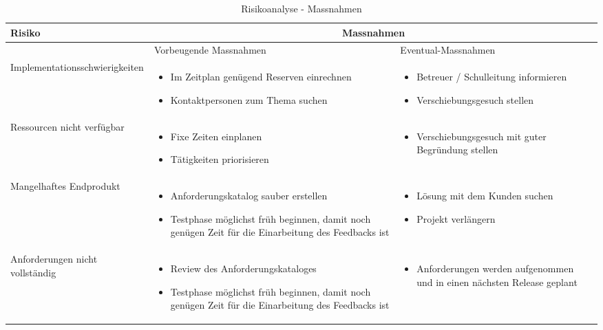 \begin{table}[ht]
\centering
  \begin{tabular}{  l | p{4cm} | p{4cm} }
	\hline
	\rowcolor{darkgray}
	Risiko							&	\multicolumn{2}{|c|}{Massnahmen} \\ \hline
	\rowcolor{gray}
								&	Vorbeugende Massnahmen & Eventual-Massnahmen	\\ \hline
	Implementationsschwierigkeiten
								&	\begin{itemize}
										\item Im Zeitplan genügend Reserven einrechnen
										\item Kontaktpersonen zum Thema suchen
									\end{itemize}
								&	\begin{itemize}
										\item Betreuer / Schulleitung informieren
										\item Verschiebungsgesuch stellen
									\end{itemize}						\\ \hline
	Ressourcen nicht verfügbar
								&	\begin{itemize}
										\item Fixe Zeiten einplanen
										\item Tätigkeiten priorisieren
									\end{itemize}
								&	\begin{itemize}
										\item Verschiebungsgesuch mit guter Begründung stellen
									\end{itemize}	\\ \hline
	Mangelhaftes Endprodukt		
								&	\begin{itemize}
										\item Anforderungskatalog sauber erstellen
										\item Testphase möglichst früh beginnen, damit noch genügen Zeit für die Einarbeitung des Feedbacks ist
									\end{itemize}
								&	\begin{itemize}
										\item Lösung mit dem Kunden suchen
										\item Projekt verlängern
									\end{itemize}	\\ \hline	
	Anforderungen nicht vollständig	
								&	\begin{itemize}
										\item Review des Anforderungskataloges
										\item Testphase möglichst früh beginnen, damit noch genügen Zeit für die Einarbeitung des Feedbacks ist
									\end{itemize}
								&	\begin{itemize}
										\item Anforderungen werden aufgenommen und in einen nächsten Release geplant											
									\end{itemize}	\\ \hline			
  \end{tabular}
   \caption{Risikoanalyse - Massnahmen}
\end{table}


